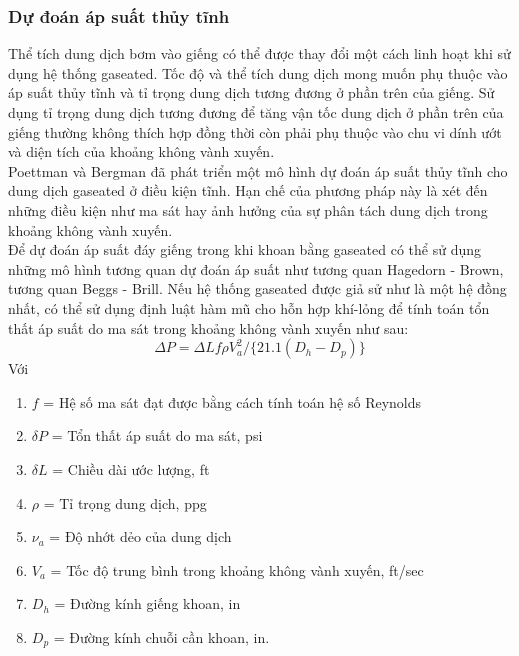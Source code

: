\documentclass[12pt,a4paper]{article}
\begin{document}
\subsubsection{Dự đoán áp suất thủy tĩnh}
	Thể tích dung dịch bơm vào giếng có thể được thay đổi một cách linh hoạt khi sử dụng hệ thống gaseated. Tốc độ và thể tích dung dịch mong muốn phụ thuộc vào áp suất thủy tĩnh và tỉ trọng dung dịch tương đương ở phần trên của giếng. Sử dụng tỉ trọng dung dịch tương đương để tăng vận tốc dung dịch ở phần trên của giếng thường không thích hợp đồng thời còn phải phụ thuộc vào chu vi dính ướt và diện tích của khoảng không vành xuyến.\\
	Poettman và Bergman đã phát triển một mô hình dự đoán áp suất thủy tĩnh cho dung dịch gaseated ở điều kiện tĩnh. Hạn chế của phương pháp này là xét đến những điều kiện như ma sát hay ảnh hưởng của sự phân tách dung dịch trong khoảng không vành xuyến.\\
	Để dự đoán áp suất đáy giếng trong khi khoan bằng gaseated có thể sử dụng những mô hình tương quan dự đoán áp suất như tương quan Hagedorn - Brown, tương quan Beggs - Brill\cite{rehm2013underbalanced}. Nếu hệ thống gaseated được giả sử như là một hệ đồng nhất, có thể sử dụng định luật hàm mũ cho hỗn hợp khí-lỏng để tính toán tổn thất áp suất do ma sát trong khoảng không vành xuyến như sau:
	\begin{equation}
	\Delta P = \Delta L f \rho V_a^2/\{21.1(D_h-D_p)\}
	\end{equation}
	Với
	\begin{enumerate}
		\item[] $f$ = Hệ số ma sát đạt được bằng cách tính toán hệ số Reynolds
		\item[] $\delta P$ = Tổn thất áp suất do ma sát, psi
		\item[] $\delta L$ = Chiều dài ước lượng, ft
		\item[] $\rho$ = Tỉ trọng dung dịch, ppg
		\item[] $\nu_a$ = Độ nhớt dẻo của dung dịch
		\item[] $V_a$ = Tốc độ trung bình trong khoảng không vành xuyến, ft/sec
		\item[] $D_h$ = Đường kính giếng khoan, in
		\item[] $D_p$ = Đường kính chuỗi cần khoan, in.
	\end{enumerate}
\end{document}
